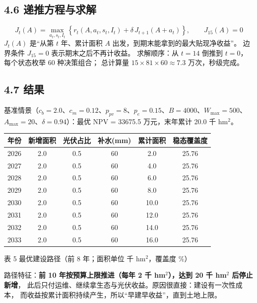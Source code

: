 \documentclass[11pt,a4paper]{ctexart}
\begin{document}
\subsection*{4.6 递推方程与求解}
\begin{equation}
J_t(A)=\max_{a_t,s_t,I_t}\left\{r_t(A,a_t,s_t,I_t)+\delta\,J_{t+1}(A+a_t)\right\},
\qquad J_{15}(A)=0
\end{equation}
$J_t(A)$ 是“从第 $t$ 年、累计面积 $A$ 出发，到期末能拿到的最大贴现净收益”。
边界条件 $J_{15}=0$ 表示期末之后不再计收益。
求解顺序：从 $t=14$ 倒推到 $t=0$，每个状态枚举 60 种决策组合；
总计算量 $15\times81\times60\approx7.3$ 万次，秒级完成。

\subsection*{4.7 结果}
基准情景（$c_b=2.0$、$c_m=0.12$、$p_{pv}=8$、$p_e=0.15$、$B=4000$、$W_{\max}=500$、
$A_{\max}=20$、$\delta=0.94$）：最优 NPV = 33675.5 万元，末年累计 20.0 千 hm$^2$。
\begin{table}[H]\centering\small
\begin{tabular}{|c|c|c|c|c|c|}
\toprule
年份 & 新增面积 & 光伏占比 & 补水(mm) & 累计面积 & 稳态覆盖度 \\
\midrule
2026 & 2.0 & 0.5 & 60 & 2.0 & 25.76 \\
2027 & 2.0 & 0.5 & 60 & 4.0 & 25.76 \\
2028 & 2.0 & 0.5 & 60 & 6.0 & 25.76 \\
2029 & 2.0 & 0.5 & 60 & 8.0 & 25.76 \\
2030 & 2.0 & 0.5 & 60 & 10.0 & 25.76 \\
2031 & 2.0 & 0.5 & 60 & 12.0 & 25.76 \\
2032 & 2.0 & 0.5 & 60 & 14.0 & 25.76 \\
2033 & 2.0 & 0.5 & 60 & 16.0 & 25.76 \\
\bottomrule
\end{tabular}
\begin{center}\small 表 5  最优建设路径（前 8 年；面积单位 千 hm$^2$，覆盖度 \%）\end{center}
\end{table}
路径特征：\textbf{前 10 年按预算上限推进（每年 2 千 hm$^2$），达到 20 千 hm$^2$ 后停止新增}，
此后只付运维、继续拿生态与光伏收益。原因很直接：建设有一次性成本，
而收益按累计面积持续产生，所以“早建早收益”，直到土地上限。
\end{document}
